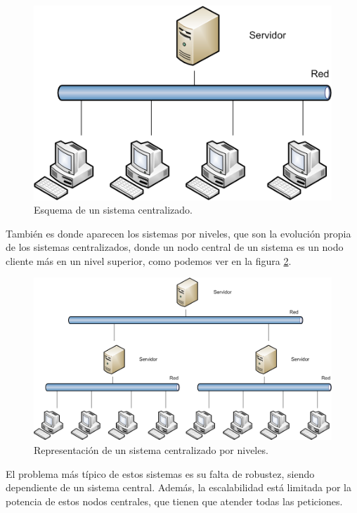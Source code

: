 \begin{figure}
	\centering
	\includegraphics[scale=0.6]{images/scentralizado.png}
	\caption[Sistema centralizado]{Esquema de un sistema centralizado.}
	\label{fig:client-server}
\end{figure}

También es donde aparecen los sistemas por niveles, que son la 
evolución propia de los sistemas centralizados, donde un nodo 
central de un sistema es un nodo cliente más en un nivel superior, 
como podemos ver en la figura \ref{fig:multilevel-server}.

\begin{figure}
	\centering
	\includegraphics[scale=0.3]{images/sjerarquico.png}
	\caption[Sistema jerárquico]{Representación de un sistema centralizado por niveles.}
	\label{fig:multilevel-server}
\end{figure}

El problema más típico de estos sistemas es su falta de robustez, 
siendo dependiente de un sistema central. Además, la escalabilidad 
está limitada por la potencia de estos nodos centrales, que tienen que 
atender todas las peticiones.

